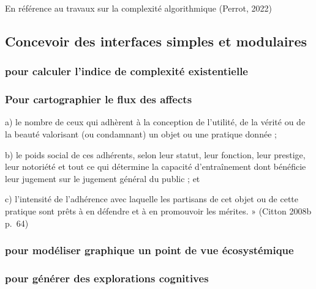 \documentclass[
  letterpaper,
  DIV=11,
  numbers=noendperiod]{scrreprt}
\begin{document}
En référence au travaux sur la complexité algorithmique (Perrot, 2022)

\hypertarget{concevoir-des-interfaces-simples-et-modulaires}{%
\subsection{Concevoir des interfaces simples et
modulaires}\label{concevoir-des-interfaces-simples-et-modulaires}}

\hypertarget{pour-calculer-lindice-de-complexituxe9-existentielle}{%
\subsubsection{pour calculer l'indice de complexité
existentielle}\label{pour-calculer-lindice-de-complexituxe9-existentielle}}

\hypertarget{pour-cartographier-le-flux-des-affects}{%
\subsubsection{Pour cartographier le flux des
affects}\label{pour-cartographier-le-flux-des-affects}}

a) le nombre de ceux qui adhèrent à la conception de l'utilité, de la
vérité ou de la beauté valorisant (ou condamnant) un objet ou une
pratique donnée ;

b) le poids social de ces adhérents, selon leur statut, leur fonction,
leur prestige, leur notoriété et tout ce qui détermine la capacité
d'entraînement dont bénéficie leur jugement sur le jugement général du
public ; et

c) l'intensité de l'adhérence avec laquelle les partisans de cet objet
ou de cette pratique sont prêts à en défendre et à en promouvoir les
mérites. » (Citton 2008b p.~64)

\hypertarget{pour-moduxe9liser-graphique-un-point-de-vue-uxe9cosystuxe9mique}{%
\subsubsection{pour modéliser graphique un point de vue
écosystémique}\label{pour-moduxe9liser-graphique-un-point-de-vue-uxe9cosystuxe9mique}}

\hypertarget{pour-guxe9nuxe9rer-des-explorations-cognitives}{%
\subsubsection{pour générer des explorations
cognitives}\label{pour-guxe9nuxe9rer-des-explorations-cognitives}}
\end{document}
